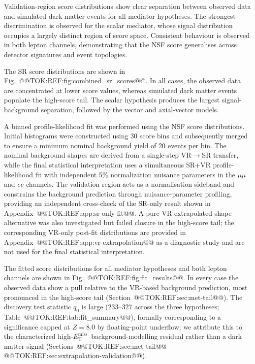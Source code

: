\documentclass[11pt]{article}
\newcommand{\MET}{\ensuremath{E_{\mathrm{T}}^{\mathrm{miss}}}}
\begin{document}
Validation-region score distributions show clear separation between observed
data and simulated dark matter events for all mediator hypotheses. The
strongest discrimination is observed for the scalar mediator, whose signal
distribution occupies a largely distinct region of score space. Consistent
behaviour is observed in both lepton channels, demonstrating that the NSF
score generalises across detector signatures and event topologies.

The SR score distributions are shown in Fig.~@@TOK:REF:fig:combined_sr_scores@@. In all cases, the observed data are concentrated at lower score values, whereas simulated dark matter events populate the high-score tail. The scalar hypothesis produces the largest signal-background separation, followed by the vector and axial-vector models.

A binned profile-likelihood fit was performed using the NSF score distributions.
Initial histograms were constructed using 30 score bins and subsequently merged
to ensure a minimum nominal background yield of 20 events per bin. The nominal
background shapes are derived from a single-step VR$\to$SR transfer, while the
final statistical interpretation uses a simultaneous SR+VR profile-likelihood
fit with independent 5\% normalization nuisance parameters in the $\mu\mu$
and $ee$ channels. The validation region acts as a normalisation sideband and
constrains the background prediction through nuisance-parameter profiling,
providing an independent cross-check of the SR-only result shown in
Appendix~@@TOK:REF:app:sr-only-fit@@.
A pure VR-extrapolated shape alternative was also investigated but failed closure in the high-score tail; the corresponding VR-only post-fit distributions are provided in Appendix~@@TOK:REF:app:vr-extrapolation@@ as a diagnostic study and are not used for the final statistical interpretation.

The fitted score distributions for all mediator hypotheses and both lepton
channels are shown in Fig.~@@TOK:REF:fig:fit_results@@. In every case the observed
data show a pull relative to the VR-based background prediction, most
pronounced in the high-score tail (Section~@@TOK:REF:sec:met-tail@@).
The discovery test statistic \(q_0\) is large (233--327 across the three
hypotheses; Table~@@TOK:REF:tab:fit_summary@@), formally corresponding to a
significance capped at \(Z=8.0\) by floating-point underflow; we attribute
this to the characterized high-\MET\ background-modelling residual rather
than a dark matter signal (Sections~@@TOK:REF:sec:met-tail@@--@@TOK:REF:sec:extrapolation-validation@@).
\end{document}
